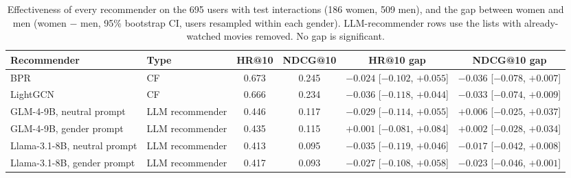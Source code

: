 \begin{table}[t]
\centering\small
\caption{Effectiveness of every recommender on the 695 users with test interactions (186 women, 509 men), and the gap between women and men (women $-$ men, 95\% bootstrap CI, users resampled within each gender). LLM-recommender rows use the lists with already-watched movies removed. No gap is significant.}
\label{tab:effectiveness}
\begin{tabular}{llcccc}
\toprule
Recommender & Type & HR@10 & NDCG@10 & HR@10 gap & NDCG@10 gap \\
\midrule
BPR & CF & 0.673 & 0.245 & $-0.024$ [$-0.102$, $+0.055$] & $-0.036$ [$-0.078$, $+0.007$] \\
LightGCN & CF & 0.666 & 0.234 & $-0.036$ [$-0.118$, $+0.044$] & $-0.033$ [$-0.074$, $+0.009$] \\
GLM-4-9B, neutral prompt & LLM recommender & 0.446 & 0.117 & $-0.029$ [$-0.114$, $+0.055$] & $+0.006$ [$-0.025$, $+0.037$] \\
GLM-4-9B, gender prompt & LLM recommender & 0.435 & 0.115 & $+0.001$ [$-0.081$, $+0.084$] & $+0.002$ [$-0.028$, $+0.034$] \\
Llama-3.1-8B, neutral prompt & LLM recommender & 0.413 & 0.095 & $-0.035$ [$-0.119$, $+0.046$] & $-0.017$ [$-0.042$, $+0.008$] \\
Llama-3.1-8B, gender prompt & LLM recommender & 0.417 & 0.093 & $-0.027$ [$-0.108$, $+0.058$] & $-0.023$ [$-0.046$, $+0.001$] \\
\bottomrule
\end{tabular}
\end{table}
